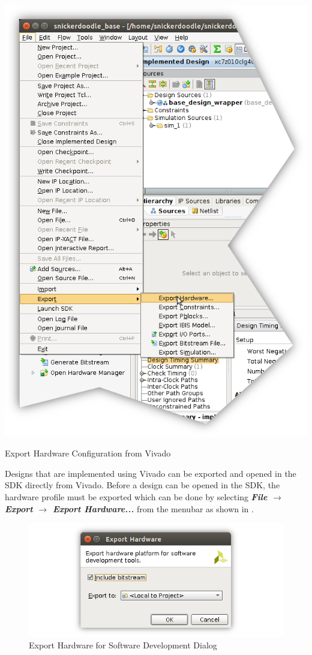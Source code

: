 \begin{marginfigure}
	\centering
	\includegraphics{images/Export_Hardware.png}
	\caption[Export Hardware Configuration from Vivado]{Export Hardware Configuration from Vivado}
	\label{fig:exporthardware}
\end{marginfigure}

Designs that are implemented using Vivado can be exported and opened in the SDK directly from Vivado. Before a design can be opened in the SDK, the hardware profile must be exported which can be done by selecting \textit{\bfseries File $\rightarrow$ Export $\rightarrow$ Export Hardware...} from the menubar as shown in . \\


\begin{figure}
	\centering
	\includegraphics{images/Export_Hardware_Dialog.png}
	\caption{Export Hardware for Software Development Dialog}
	\label{fig:exporthardwaredialog}
\end{figure}

